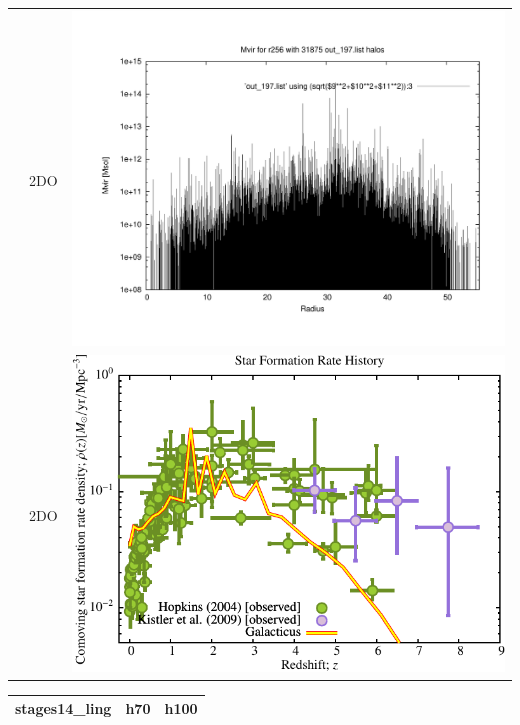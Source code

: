 \documentclass[a4paper,11pt,fleqn,oneside]{book}
\begin{document}
\begin{itemize}
\begin{table}[p]
\begin{tabular}{l|c|c}
 & 2DO & \includegraphics[scale=0.25]{r256/h100/stages_14/plot_mvir_out_197.pdf} \\
 & 2DO & \includegraphics[scale=0.5]{r256/h100/stages_14/Plot_Star_Formation_History.pdf} \\
\end{tabular}
\end{table}
\begin{table}[p]
\centering
\begin{tabular}{l|c|c}
stages14\_ling & h70 & h100 \\
\hline 

\end{tabular}
\end{table}
\end{itemize}
\end{document}
